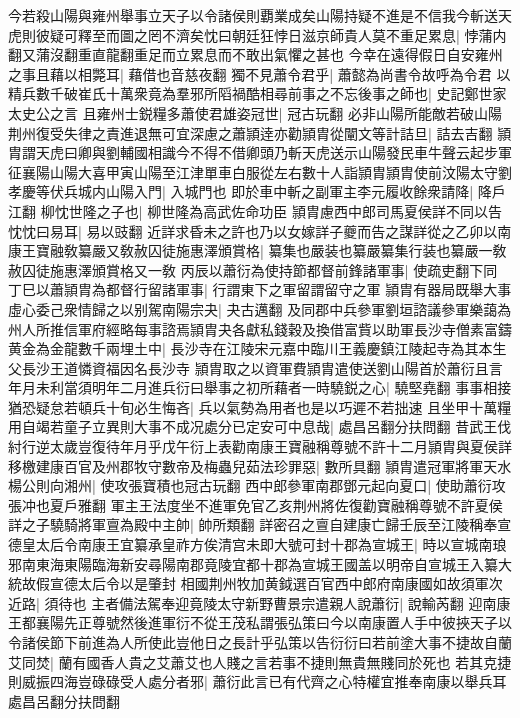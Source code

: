 今若殺山陽與雍州舉事立天子以令諸侯則覇業成矣山陽持疑不進是不信我今斬送天虎則彼疑可釋至而圖之罔不濟矣忱曰朝廷狂悖日滋京師貴人莫不重足累息|{
	悖蒲内翻又蒲沒翻重直龍翻重足而立累息而不敢出氣懼之甚也}
今幸在遠得假日自安雍州之事且藉以相斃耳|{
	藉借也音慈夜翻}
獨不見蕭令君乎|{
	蕭懿為尚書令故呼為令君}
以精兵數千破崔氏十萬衆竟為羣邪所䧟禍酷相尋前事之不忘後事之師也|{
	史記鄭世家太史公之言}
且雍州士鋭糧多蕭使君雄姿冠世|{
	冠古玩翻}
必非山陽所能敵若破山陽荆州復受失律之責進退無可宜深慮之蕭頴逹亦勸頴胄從闡文等計詰旦|{
	詰去吉翻}
頴胄謂天虎曰卿與劉輔國相識今不得不借卿頭乃斬天虎送示山陽發民車牛聲云起步軍征襄陽山陽大喜甲寅山陽至江津單車白服從左右數十人詣頴胄頴胄使前汶陽太守劉孝慶等伏兵城内山陽入門|{
	入城門也}
即於車中斬之副軍主李元履收餘衆請降|{
	降戶江翻}
柳忱世隆之子也|{
	柳世隆為高武佐命功臣}
頴胄慮西中郎司馬夏侯詳不同以告忱忱曰易耳|{
	易以豉翻}
近詳求昏未之許也乃以女嫁詳子夔而告之謀詳從之乙卯以南康王寶融敎纂嚴又敎赦囚徒施惠澤頒賞格|{
	纂集也嚴装也纂嚴纂集行装也纂嚴一敎赦囚徒施惠澤頒賞格又一敎}
丙辰以蕭衍為使持節都督前鋒諸軍事|{
	使疏吏翻下同}
丁巳以蕭頴胄為都督行留諸軍事|{
	行謂東下之軍留謂留守之軍}
頴胄有器局既舉大事虛心委己衆情歸之以别駕南陽宗夬|{
	夬古邁翻}
及同郡中兵參軍劉垣諮議參軍樂藹為州人所推信軍府經略每事諮焉頴胄夬各獻私錢穀及換借富貲以助軍長沙寺僧素富鑄黄金為金龍數千兩埋土中|{
	長沙寺在江陵宋元嘉中臨川王義慶鎮江陵起寺為其本生父長沙王道憐資福因名長沙寺}
頴胄取之以資軍費頴胄遣使送劉山陽首於蕭衍且言年月未利當須明年二月進兵衍曰舉事之初所藉者一時驍鋭之心|{
	驍堅堯翻}
事事相接猶恐疑怠若頓兵十旬必生悔吝|{
	兵以氣勢為用者也是以巧遲不若拙速}
且坐甲十萬糧用自竭若童子立異則大事不成况處分已定安可中息哉|{
	處昌呂翻分扶問翻}
昔武王伐紂行逆太歲豈復待年月乎戊午衍上表勸南康王寶融稱尊號不許十二月頴胄與夏侯詳移檄建康百官及州郡牧守數帝及梅蟲兒茹法珍罪惡|{
	數所具翻}
頴胄遣冠軍將軍天水楊公則向湘州|{
	使攻張寶積也冠古玩翻}
西中郎參軍南郡鄧元起向夏口|{
	使助蕭衍攻張冲也夏戶雅翻}
軍主王法度坐不進軍免官乙亥荆州將佐復勸寶融稱尊號不許夏侯詳之子驍騎將軍亶為殿中主帥|{
	帥所類翻}
詳密召之亶自建康亡歸壬辰至江陵稱奉宣德皇太后令南康王宜纂承皇祚方俟清宫未即大號可封十郡為宣城王|{
	時以宣城南琅邪南東海東陽臨海新安尋陽南郡竟陵宜都十郡為宣城王國盖以明帝自宣城王入纂大統故假宣德太后令以是肇封}
相國荆州牧加黄鉞選百官西中郎府南康國如故須軍次近路|{
	須待也}
主者備法駕奉迎竟陵太守新野曹景宗遣親人說蕭衍|{
	說輸芮翻}
迎南康王都襄陽先正尊號然後進軍衍不從王茂私謂張弘策曰今以南康置人手中彼挾天子以令諸侯節下前進為人所使此豈他日之長計乎弘策以告衍衍曰若前塗大事不捷故自蘭艾同焚|{
	蘭有國香人貴之艾蕭艾也人賤之言若事不捷則無貴無賤同於死也}
若其克捷則威振四海豈碌碌受人處分者邪|{
	蕭衍此言已有代齊之心特權宜推奉南康以舉兵耳處昌呂翻分扶問翻}
